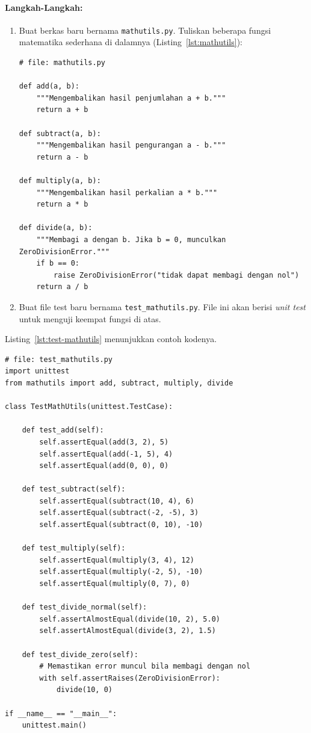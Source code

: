 \paragraph{Langkah-Langkah:}
\begin{enumerate}
    \item Buat berkas baru bernama \texttt{mathutils.py}.  
    Tuliskan beberapa fungsi matematika sederhana di dalamnya (Listing~\ref{lst:mathutils}):

\begin{lstlisting}[style=PythonStyle, caption={Modul fungsi matematika sederhana}, label={lst:mathutils}]
# file: mathutils.py

def add(a, b):
    """Mengembalikan hasil penjumlahan a + b."""
    return a + b

def subtract(a, b):
    """Mengembalikan hasil pengurangan a - b."""
    return a - b

def multiply(a, b):
    """Mengembalikan hasil perkalian a * b."""
    return a * b

def divide(a, b):
    """Membagi a dengan b. Jika b = 0, munculkan ZeroDivisionError."""
    if b == 0:
        raise ZeroDivisionError("tidak dapat membagi dengan nol")
    return a / b
\end{lstlisting}

    \item Buat file test baru bernama \texttt{test\_mathutils.py}.  
    File ini akan berisi \textit{unit test} untuk menguji keempat fungsi di atas.
\end{enumerate}

Listing~\ref{lst:test-mathutils} menunjukkan contoh kodenya.

\begin{lstlisting}[style=PythonStyle, caption={Pengujian fungsi matematika menggunakan unittest}, label={lst:test-mathutils}]
# file: test_mathutils.py
import unittest
from mathutils import add, subtract, multiply, divide

class TestMathUtils(unittest.TestCase):

    def test_add(self):
        self.assertEqual(add(3, 2), 5)
        self.assertEqual(add(-1, 5), 4)
        self.assertEqual(add(0, 0), 0)

    def test_subtract(self):
        self.assertEqual(subtract(10, 4), 6)
        self.assertEqual(subtract(-2, -5), 3)
        self.assertEqual(subtract(0, 10), -10)

    def test_multiply(self):
        self.assertEqual(multiply(3, 4), 12)
        self.assertEqual(multiply(-2, 5), -10)
        self.assertEqual(multiply(0, 7), 0)

    def test_divide_normal(self):
        self.assertAlmostEqual(divide(10, 2), 5.0)
        self.assertAlmostEqual(divide(3, 2), 1.5)

    def test_divide_zero(self):
        # Memastikan error muncul bila membagi dengan nol
        with self.assertRaises(ZeroDivisionError):
            divide(10, 0)

if __name__ == "__main__":
    unittest.main()
\end{lstlisting}

